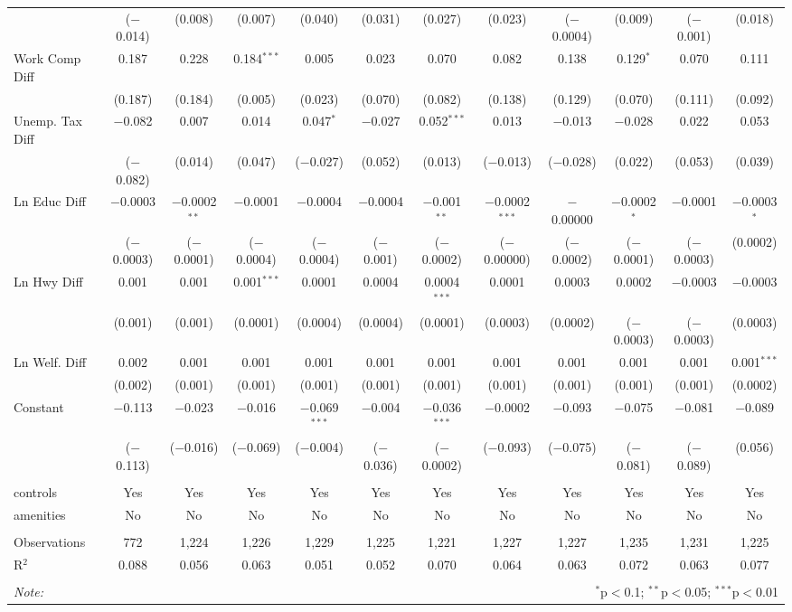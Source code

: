 \begin{table}[!htbp]
\begin{tabular}{@{\extracolsep{5pt}}lccccccccccc}
  & ($-$0.014) & (0.008) & (0.007) & (0.040) & (0.031) & (0.027) & (0.023) & ($-$0.0004) & (0.009) & ($-$0.001) & (0.018) \\ 
  Work Comp Diff & 0.187 & 0.228 & 0.184$^{***}$ & 0.005 & 0.023 & 0.070 & 0.082 & 0.138 & 0.129$^{*}$ & 0.070 & 0.111 \\ 
  & (0.187) & (0.184) & (0.005) & (0.023) & (0.070) & (0.082) & (0.138) & (0.129) & (0.070) & (0.111) & (0.092) \\ 
  Unemp. Tax Diff & $-$0.082 & 0.007 & 0.014 & 0.047$^{*}$ & $-$0.027 & 0.052$^{***}$ & 0.013 & $-$0.013 & $-$0.028 & 0.022 & 0.053 \\ 
  & ($-$0.082) & (0.014) & (0.047) & ($-$0.027) & (0.052) & (0.013) & ($-$0.013) & ($-$0.028) & (0.022) & (0.053) & (0.039) \\ 
  Ln Educ Diff & $-$0.0003 & $-$0.0002$^{**}$ & $-$0.0001 & $-$0.0004 & $-$0.0004 & $-$0.001$^{**}$ & $-$0.0002$^{***}$ & $-$0.00000 & $-$0.0002$^{*}$ & $-$0.0001 & $-$0.0003$^{*}$ \\ 
  & ($-$0.0003) & ($-$0.0001) & ($-$0.0004) & ($-$0.0004) & ($-$0.001) & ($-$0.0002) & ($-$0.00000) & ($-$0.0002) & ($-$0.0001) & ($-$0.0003) & (0.0002) \\ 
  Ln Hwy Diff & 0.001 & 0.001 & 0.001$^{***}$ & 0.0001 & 0.0004 & 0.0004$^{***}$ & 0.0001 & 0.0003 & 0.0002 & $-$0.0003 & $-$0.0003 \\ 
  & (0.001) & (0.001) & (0.0001) & (0.0004) & (0.0004) & (0.0001) & (0.0003) & (0.0002) & ($-$0.0003) & ($-$0.0003) & (0.0003) \\ 
  Ln Welf. Diff & 0.002 & 0.001 & 0.001 & 0.001 & 0.001 & 0.001 & 0.001 & 0.001 & 0.001 & 0.001 & 0.001$^{***}$ \\ 
  & (0.002) & (0.001) & (0.001) & (0.001) & (0.001) & (0.001) & (0.001) & (0.001) & (0.001) & (0.001) & (0.0002) \\ 
  Constant & $-$0.113 & $-$0.023 & $-$0.016 & $-$0.069$^{***}$ & $-$0.004 & $-$0.036$^{***}$ & $-$0.0002 & $-$0.093 & $-$0.075 & $-$0.081 & $-$0.089 \\ 
  & ($-$0.113) & ($-$0.016) & ($-$0.069) & ($-$0.004) & ($-$0.036) & ($-$0.0002) & ($-$0.093) & ($-$0.075) & ($-$0.081) & ($-$0.089) & (0.056) \\ 
 \hline \\[-1.8ex] 
controls & Yes & Yes & Yes & Yes & Yes & Yes & Yes & Yes & Yes & Yes & Yes \\ 
amenities & No & No & No & No & No & No & No & No & No & No & No \\ 
\hline \\[-1.8ex] 
Observations & 772 & 1,224 & 1,226 & 1,229 & 1,225 & 1,221 & 1,227 & 1,227 & 1,235 & 1,231 & 1,225 \\ 
R$^{2}$ & 0.088 & 0.056 & 0.063 & 0.051 & 0.052 & 0.070 & 0.064 & 0.063 & 0.072 & 0.063 & 0.077 \\ 
\hline 
\hline \\[-1.8ex] 
\textit{Note:}  & \multicolumn{11}{r}{$^{*}$p$<$0.1; $^{**}$p$<$0.05; $^{***}$p$<$0.01} \\ 
\end{tabular} 
\end{table} 
